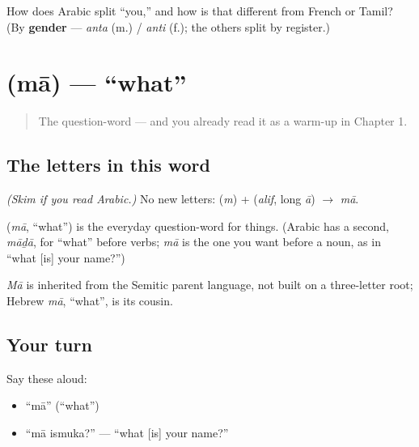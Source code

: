 \begin{tcolorbox}[breakable,colback=teal!4,colframe=teal!35!black,title={Before you move on}]
How does Arabic split \textquotedblleft{}you,\textquotedblright{} and how is that different from French or Tamil? (By \textbf{gender} — \emph{anta} (m.) / \emph{anti} (f.); the others split by register.)
\end{tcolorbox}
\section[\texorpdfstring{\ar{ما} (mā)}{ما (mā)}]{ (mā) — \textquotedblleft{}what\textquotedblright{}}

\label{lesson:AR-C02-maa}



\begin{quote}
The question-word — and you already read it as a warm-up in Chapter 1.
\end{quote}

\subsection*{The letters in this word}
\emph{(Skim if you read Arabic.)} No new letters: \textbf{} (\emph{m}) + \textbf{} (\emph{alif}, long \emph{ā}) $\to$ \textbf{} \emph{mā}.

\begin{cousinweb}
\textbf{} (\emph{mā}, \textquotedblleft{}what\textquotedblright{}) is the everyday question-word for things. (Arabic has a second, \emph{māḏā}, for \textquotedblleft{}what\textquotedblright{} before verbs; \emph{mā} is the one you want before a noun, as in \textquotedblleft{}what {[}is{]} your name?\textquotedblright{})

\emph{Mā} is inherited from the Semitic parent language, not built on a three-letter root; Hebrew \emph{mā}, \textquotedblleft{}what\textquotedblright{}, is its cousin.
\end{cousinweb}

\subsection*{Your turn}
Say these aloud:

\begin{itemize}
\raggedright
  \item \textquotedblleft{}mā\textquotedblright{} (\textquotedblleft{}what\textquotedblright{})
  \item \textquotedblleft{}mā ismuka?\textquotedblright{} — \textquotedblleft{}what {[}is{]} your name?\textquotedblright{}
\end{itemize}

